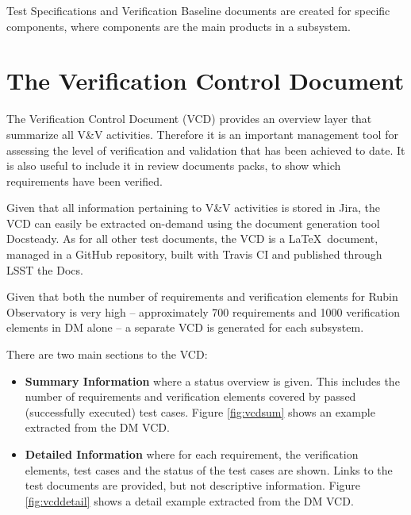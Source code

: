 Test Specifications and Verification Baseline documents are created for specific components, where components are the main products in a subsystem.


\section{The Verification Control Document}
\label{sec:vcd}

The Verification Control Document (VCD) provides an overview layer that summarize all V\&V activities.
Therefore it is an important management tool for assessing the level of verification and validation that has been achieved to date.
It is also useful to include it in review documents packs, to show which requirements have been verified.

Given that all information pertaining to V\&V activities is stored in Jira, the VCD can easily be extracted on-demand using the document generation tool Docsteady.
As for all other test documents, the VCD is a \LaTeX~document, managed in a GitHub repository, built with Travis CI and published through LSST the Docs.

Given that both the number of requirements and verification elements for Rubin Observatory is very high --
approximately 700 requirements and 1000 verification elements in DM alone -- a separate VCD is generated for each subsystem.

There are two main sections to the VCD:

\begin{itemize}
\item \textbf{Summary Information} where a status overview is given.
This includes the number of requirements and verification elements covered by passed (successfully executed) test cases.
Figure \ref{fig:vcdsum} shows an example extracted from the DM VCD.
\item \textbf{Detailed Information} where for each requirement, the verification elements, test cases
and the status of the test cases are shown. Links to the test documents are provided, but not descriptive information.
Figure \ref{fig:vcddetail} shows a detail example extracted from the DM VCD.
\end{itemize}


